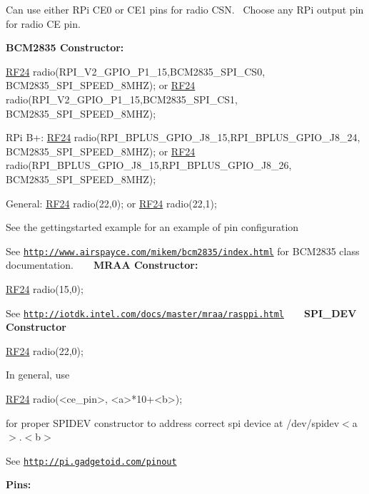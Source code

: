 Can use either R\+Pi C\+E0 or C\+E1 pins for radio C\+SN.~\newline
 Choose any R\+Pi output pin for radio CE pin.

{\bfseries B\+C\+M2835 Constructor\+:} 
\begin{DoxyCode}
\hyperlink{classRF24}{RF24} radio(RPI\_V2\_GPIO\_P1\_15,BCM2835\_SPI\_CS0, BCM2835\_SPI\_SPEED\_8MHZ);
 or
\hyperlink{classRF24}{RF24} radio(RPI\_V2\_GPIO\_P1\_15,BCM2835\_SPI\_CS1, BCM2835\_SPI\_SPEED\_8MHZ);
  
RPi B+:
\hyperlink{classRF24}{RF24} radio(RPI\_BPLUS\_GPIO\_J8\_15,RPI\_BPLUS\_GPIO\_J8\_24, BCM2835\_SPI\_SPEED\_8MHZ);
or
\hyperlink{classRF24}{RF24} radio(RPI\_BPLUS\_GPIO\_J8\_15,RPI\_BPLUS\_GPIO\_J8\_26, BCM2835\_SPI\_SPEED\_8MHZ);

General:
\hyperlink{classRF24}{RF24} radio(22,0);
or
\hyperlink{classRF24}{RF24} radio(22,1);
\end{DoxyCode}
 See the gettingstarted example for an example of pin configuration

See \href{http://www.airspayce.com/mikem/bcm2835/index.html}{\tt http\+://www.\+airspayce.\+com/mikem/bcm2835/index.\+html} for B\+C\+M2835 class documentation. ~\newline
~\newline
 {\bfseries M\+R\+AA Constructor\+:}


\begin{DoxyCode}
\hyperlink{classRF24}{RF24} radio(15,0); 
\end{DoxyCode}


See \href{http://iotdk.intel.com/docs/master/mraa/rasppi.html}{\tt http\+://iotdk.\+intel.\+com/docs/master/mraa/rasppi.\+html} ~\newline
~\newline
 {\bfseries S\+P\+I\+\_\+\+D\+EV Constructor}


\begin{DoxyCode}
\hyperlink{classRF24}{RF24} radio(22,0); 
\end{DoxyCode}
 In general, use
\begin{DoxyCode}
\hyperlink{classRF24}{RF24} radio(<ce\_pin>, <a>*10+<b>); 
\end{DoxyCode}
 for proper S\+P\+I\+D\+EV constructor to address correct spi device at /dev/spidev$<$a$>$.$<$b$>$

See \href{http://pi.gadgetoid.com/pinout}{\tt http\+://pi.\+gadgetoid.\+com/pinout}

{\bfseries Pins\+:}

